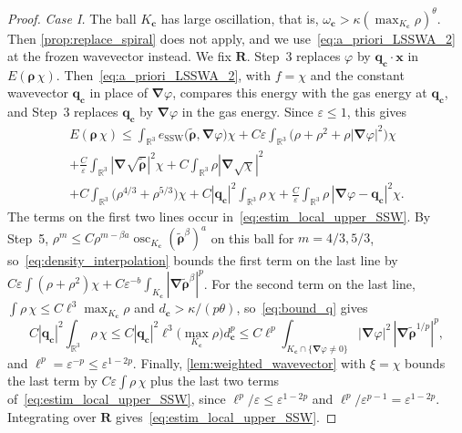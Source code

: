 \documentclass[final,reqno]{amsart}
\theoremstyle{remark}
\renewcommand{\le}{\leqslant}
\renewcommand{\epsilon}{\varepsilon}
\newcommand{\wt}[1]{\widetilde{#1}}
\newcommand{\RR}{\mathbb{R}}
\newcommand{\SSW}{\mathrm{SSW}}
\newcommand{\grad}{\bm{\nabla}}
\begin{document}
\begin{proof}
\emph{Case I.} The ball $K_{\mathbf{c}}$ has large oscillation, that is, $\omega_{\mathbf{c}}>\kappa(\max_{K_{\mathbf{c}}}\rho)^\theta$. Then \cref{prop:replace_spiral} does not apply, and we use~\cref{eq:a_priori_LSSWA_2} at the frozen wavevector instead. We fix $\mathbf{R}$. Step~3 replaces $\varphi$ by $\mathbf{q}_{\mathbf{c}}\cdot\mathbf{x}$ in $E(\bm{\rho}\,\chi)$. Then~\cref{eq:a_priori_LSSWA_2}, with $f=\chi$ and the constant wavevector $\mathbf{q}_{\mathbf{c}}$ in place of $\grad\varphi$, compares this energy with the gas energy at $\mathbf{q}_{\mathbf{c}}$, and Step~3 replaces $\mathbf{q}_{\mathbf{c}}$ by $\grad\varphi$ in the gas energy. Since $\epsilon\le1$, this gives
\begin{multline*}
E(\bm{\rho}\,\chi)\le\int_{\RR^3}e_\SSW\big(\wt{\bm{\rho}},\grad\varphi\big)\chi+C\epsilon\int_{\RR^3}\big(\rho+\rho^2+\rho|\grad\varphi|^2\big)\chi\\
+\frac C\epsilon\int_{\RR^3}|\grad\sqrt{\wt{\bm{\rho}}}|^2\chi+C\int_{\RR^3}\rho|\grad\sqrt\chi|^2\\
+C\int_{\RR^3}\big(\rho^{4/3}+\rho^{5/3}\big)\chi+C|\mathbf{q}_{\mathbf{c}}|^2\int_{\RR^3}\rho\,\chi+\frac C\epsilon\int_{\RR^3}\rho\,|\grad\varphi-\mathbf{q}_{\mathbf{c}}|^2\chi.
\end{multline*}
The terms on the first two lines occur in~\cref{eq:estim_local_upper_SSW}. By Step~5, $\rho^m\le C\rho^{m-\beta a}\operatorname{osc}_{K_{\mathbf{c}}}(\wt{\bm{\rho}}^\beta)^a$ on this ball for $m=4/3,5/3$, so~\cref{eq:density_interpolation} bounds the first term on the last line by $C\epsilon\int(\rho+\rho^2)\chi+C\epsilon^{-b}\int_{K_{\mathbf{c}}}|\grad\wt{\bm{\rho}}^\beta|^p$. For the second term on the last line, $\int\rho\,\chi\le C\ell^3\max_{K_{\mathbf{c}}}\rho$ and $d_{\mathbf{c}}>\kappa/(p\theta)$, so~\cref{eq:bound_q} gives
$$
C|\mathbf{q}_{\mathbf{c}}|^2\int_{\RR^3}\rho\,\chi\le C|\mathbf{q}_{\mathbf{c}}|^2\ell^3\Big(\max_{K_{\mathbf{c}}}\rho\Big)d_{\mathbf{c}}^p\le C\ell^p\int_{K_{\mathbf{c}}\cap\{\grad\varphi\ne0\}}|\grad\varphi|^2\,|\grad\wt{\bm{\rho}}^{1/p}|^p,
$$
and $\ell^p=\epsilon^{-p}\le\epsilon^{1-2p}$. Finally, \cref{lem:weighted_wavevector} with $\xi=\chi$ bounds the last term by $C\epsilon\int\rho\,\chi$ plus the last two terms of~\cref{eq:estim_local_upper_SSW}, since $\ell^p/\epsilon\le\epsilon^{1-2p}$ and $\ell^p/\epsilon^{p-1}=\epsilon^{1-2p}$. Integrating over $\mathbf{R}$ gives~\cref{eq:estim_local_upper_SSW}.


\end{proof}
\end{document}
